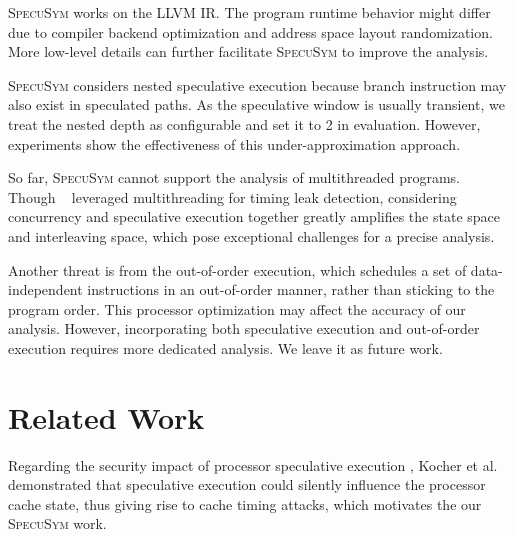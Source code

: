 \documentclass[sigconf,screen]{acmart}
\newcommand\ignore[1]{}
\newcommand{\SpecuSym}{\textsc{SpecuSym} }
\begin{document}
\SpecuSym works on the LLVM IR. The program runtime behavior might differ due 
to compiler backend optimization and address space layout randomization. More 
low-level details can further facilitate \SpecuSym to improve the analysis.


\SpecuSym considers nested speculative execution because branch instruction 
may also exist in speculated paths. As the speculative window is usually 
transient, we treat the nested depth as configurable and set it to 2 in 
evaluation. However, experiments show the effectiveness of this 
under-approximation approach.
	

So far, \SpecuSym cannot support the analysis of multithreaded programs. Though 
{}~\cite{GuoWW18} leveraged multithreading for timing leak detection, 
considering concurrency and speculative execution together greatly amplifies 
the state space and interleaving space, which pose exceptional challenges for a 
precise analysis.


Another threat is from the out-of-order execution, which schedules a set of 
data-independent instructions in an out-of-order manner, rather than sticking 
to the program order. This processor optimization may affect the accuracy of 
our analysis. However, incorporating both speculative execution and out-of-order 
execution requires more dedicated analysis. We leave it as future work. 


\ignore{
We do not consider the situation that speculative execution leverages Branch 
Target Buffer (BTB) or Return Stack Buffer (RSB) to select the destinations 
of indirect branches. Such vulnerabilities have been effectively mitigated 
by Intel and AMD through Indirect Branch Prediction Barrier (IBPB) settings.
}

\section{Related Work}
\label{sec:related}

Regarding the security impact of processor speculative execution
\cite{kimuraKT1996}, Kocher et al.~\cite{KocherGGHHLMPSY19} demonstrated 
that speculative execution could silently influence the processor cache 
state, thus giving rise to cache timing attacks, which motivates the 
our \textsc{SpecuSym} work. 
\end{document}
